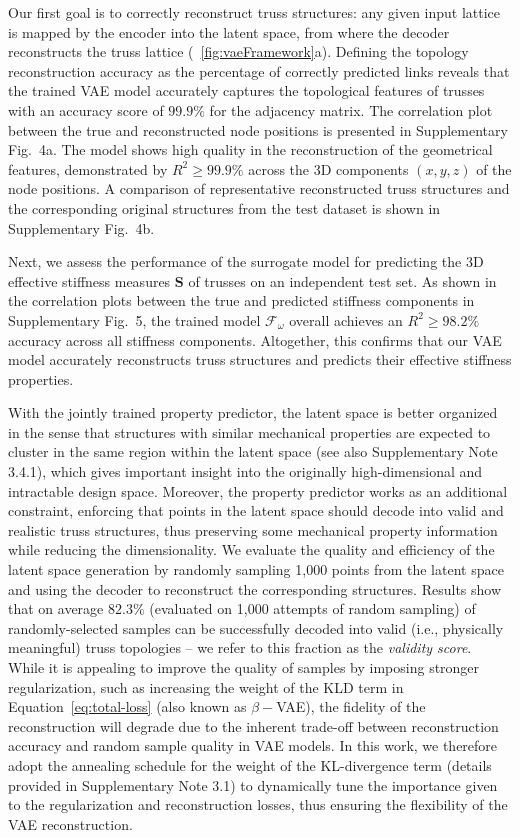 \documentclass[fleqn,10pt]{wlscirep}
\newcommand{\boldface}[1]{\boldsymbol{#1}}
\newcommand{\bfS}{\boldface{S}}
\begin{document}
Our first goal is to correctly reconstruct truss structures: any given input lattice is mapped by the encoder into the latent space, from where the decoder reconstructs the truss lattice (\figureautorefname~\ref{fig:vaeFramework}a). Defining the topology reconstruction accuracy as the percentage of correctly predicted links reveals that the trained VAE model accurately captures the topological features of trusses with an accuracy score of $99.9\%$ for the adjacency matrix. The correlation plot between the true and reconstructed node positions is presented in Supplementary Fig.~4a. The model shows high quality in the reconstruction of the geometrical features, demonstrated by $R^2 \geq 99.9\%$ across the 3D components $(x,y,z)$ of the node positions. A comparison of representative reconstructed truss structures and the corresponding original structures from the test dataset is shown in Supplementary Fig.~4b.

Next, we assess the performance of the surrogate model for predicting the 3D effective stiffness measures $\bfS$ of trusses on an independent test set. As shown in the correlation plots between the true and predicted stiffness components in Supplementary Fig.~5, the trained model $\mathcal{F}_{\omega}$ overall achieves an $R^2 \geq 98.2\%$ accuracy across all stiffness components. Altogether, this confirms that our VAE model accurately reconstructs truss structures and predicts their effective stiffness properties.

With the jointly trained property predictor, the latent space is better organized in the sense that structures with similar mechanical properties are expected to cluster in the same region within the latent space (see also Supplementary Note 3.4.1), which gives important insight into the originally high-dimensional and intractable design space. Moreover, the property predictor works as an additional constraint, enforcing that points in the latent space should decode into valid and realistic truss structures, thus preserving some mechanical property information while reducing the dimensionality. We evaluate the quality and efficiency of the latent space generation by randomly sampling 1{,}000 points from the latent space and using the decoder to reconstruct the corresponding structures. Results show that on average $82.3\%$ (evaluated on 1{,}000 attempts of random sampling) of randomly-selected samples can be successfully decoded into valid (i.e., physically meaningful) truss topologies -- we refer to this fraction as the \textit{validity score}. While it is appealing to improve the quality of samples by imposing stronger regularization, such as increasing the weight of the KLD term in Equation~\eqref{eq:total-loss} (also known as $\beta-$VAE\cite{higgins2016beta}), the fidelity of the reconstruction will degrade due to the inherent trade-off between reconstruction accuracy and random sample quality in VAE models. In this work, we therefore adopt the annealing schedule for the weight of the KL-divergence term \cite{fu2019cyclical} (details provided in Supplementary Note 3.1) to dynamically tune the importance given to the regularization and reconstruction losses, thus ensuring the flexibility of the VAE reconstruction. 
\end{document}

